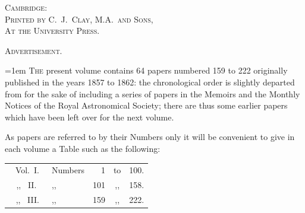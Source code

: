 \documentclass[11pt]{article}
\begin{document}
\thispagestyle{empty}
\vspace*{8cm}
\begin{center}
{\small\scshape Cambridge:}\\
{\small\scshape Printed by C.~J.~Clay, M.A.\ and Sons,}\\
{\small\scshape At the University Press.}
\end{center}
\newpage

\setcounter{page}{5}
\renewcommand{\thepage}{\roman{page}}

\begin{center}
{\Large\scshape Advertisement.}
\end{center}

\bigskip

\noindent\hangindent=1em
T\textsc{he} present volume contains 64 papers numbered 159 to 222 originally
published in the years 1857 to 1862: the chronological order is
slightly departed from for the sake of including a series of papers in the
Memoirs and the Monthly Notices of the Royal Astronomical Society;
there are thus some earlier papers which have been left over for the next
volume.

\bigskip

As papers are referred to by their Numbers only it will be convenient
to give in each volume a Table such as the following:

\medskip

\begin{center}
\begin{tabular}{r@{\quad}l@{\quad}r@{\,}c@{\,}r}
Vol.\ I.\  & Numbers & 1   & to & 100.\\
\,\,\,\,\,,, \ II.\,\,\,\,\, & ,, & 101 & ,, & 158.\\
\,\,\,\,\,,, \ III.\,\,\, & ,, & 159 & ,, & 222.
\end{tabular}
\end{center}

\newpage

\thispagestyle{empty}
\mbox{}
\newpage
\end{document}
